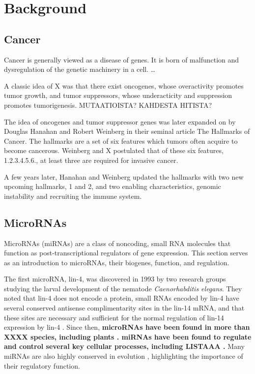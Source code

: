 


\section{Background}\label{background}










\subsection{Cancer}\label{cancer}

Cancer is generally viewed as a disease of genes. It is born of malfunction
and dysregulation of the genetic machinery in a cell.
\ldots{}

A classic idea of X was that there exist oncogenes, whose overactivity
promotes tumor growth, and tumor suppressors, whose underacticity and
suppression promotes tumorigenesis. MUTAATIOISTA? KAHDESTA HITISTA?

The idea of oncogenes and tumor suppressor genes was later expanded on by
Douglas Hanahan and Robert Weinberg in their seminal article The Hallmarks of
Cancer. The hallmarks are a set of six features which tumors often acquire to
become cancerous. Weinberg and X postulated that of these six features,
1.2.3.4.5.6., at least three are required for invasive cancer.

A few years later, Hanahan and Weinberg updated the hallmarks with two new
upcoming hallmarks, 1 and 2, and two enabling characteristics, genomic
instability and recruiting the immune system.










\subsection{MicroRNAs}\label{micrornas}

MicroRNAs (miRNAs) are a class of noncoding, small RNA molecules that function
as post-transcriptional regulators of gene expression. This section serves as
an introduction to microRNAs, their biogenes, function, and regulation.

The first microRNA, lin-4, was discovered in 1993 by two research groups
studying the larval development of the nematode \emph{Caenorhabditis elegans}.
They noted that lin-4 does not encode a protein, small RNAs encoded by lin-4
have several conserved antisense complimentarity sites in the lin-14 mRNA, and
that these sites are necessary and sufficient for the normal regulation of
lin-14 expression by lin-4 \cite{Lee1993,Wightman1993}. Since then,
\textbf{microRNAs have been found in more than XXXX species, including plants
\cite{CITE}. miRNAs have been found to regulate and control several key cellular
processes, including LISTAAA \cite{CITE}.} Many miRNAs are also highly
conserved in evolution \cite{Bartel2004}, highlighting the importance of their
regulatory function.

